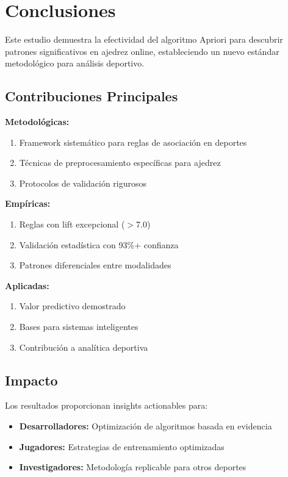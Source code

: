 \documentclass[11pt,a4paper]{article}
\begin{document}
\section{Conclusiones}

Este estudio demuestra la efectividad del algoritmo Apriori para descubrir patrones significativos en ajedrez online, estableciendo un nuevo est\'andar metodol\'ogico para an\'alisis deportivo.

\subsection{Contribuciones Principales}

\textbf{Metodol\'ogicas:}
\begin{enumerate}
\item Framework sistem\'atico para reglas de asociaci\'on en deportes
\item T\'ecnicas de preprocesamiento espec\'ificas para ajedrez
\item Protocolos de validaci\'on rigurosos
\end{enumerate}

\textbf{Emp\'iricas:}
\begin{enumerate}
\item Reglas con lift excepcional ($>$7.0)
\item Validaci\'on estad\'istica con 93\%+ confianza
\item Patrones diferenciales entre modalidades
\end{enumerate}

\textbf{Aplicadas:}
\begin{enumerate}
\item Valor predictivo demostrado
\item Bases para sistemas inteligentes
\item Contribuci\'on a anal\'itica deportiva
\end{enumerate}

\subsection{Impacto}

Los resultados proporcionan insights actionables para:
\begin{itemize}
\item \textbf{Desarrolladores:} Optimizaci\'on de algoritmos basada en evidencia
\item \textbf{Jugadores:} Estrategias de entrenamiento optimizadas
\item \textbf{Investigadores:} Metodolog\'ia replicable para otros deportes
\end{itemize}
\end{document}
